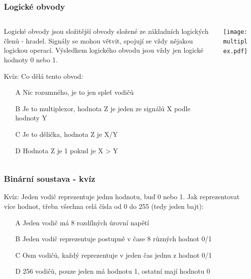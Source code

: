 \documentclass{beamer}
\begin{document}
\begin{frame}
\frametitle{Logické obvody}

\begin{columns}
\begin{column}{0.55\textwidth}
Logické obvody jsou složitější obvody složené ze základních logických členů - hradel. Signály se mohou větvit, spojují se vždy nějakou logickou operací.
Výsledkem logického obvodu jsou vždy jen logické hodnoty 0 nebo 1.

\bigskip

Kvíz: Co dělá tento obvod:
\begin{itemize}
\item[A] Nic rozumného, je to jen spleť vodičů
\item[B] Je to multiplexor, hodnota Z je jeden ze signálů X podle hodnoty Y
\item[C] Je to dělička, hodnota Z je X/Y
\item[D] Hodnota Z je 1 pokud je X > Y 
\end{itemize}
\end{column}
\begin{column}{0.45\textwidth}  
\begin{center}
   \texttt{[image: multiplex.pdf]}
\end{center}
\end{column}
\end{columns}


\end{frame}


\begin{frame}
\frametitle{Binární soustava - kvíz}

Kvíz: Jeden vodič reprezentuje jednu hodnotu, buď 0 nebo 1. Jak reprezentovat více hodnot, třeba všechna celá čísla od 0 do 255 (tedy jeden bajt):
\begin{itemize}
\item[A] Jeden vodič má 8 rozdílných úrovní napětí
\item[B] Jeden vodič reprezentuje postupně v čase 8 různých hodnot 0/1
\item[C] Osm vodičů, každý reprezentuje v jeden čas jednu z hodnot 0/1
\item[D] 256 vodičů, pouze jeden má hodnotu 1, ostatní mají hodnotu 0
\end{itemize}


\end{frame}
\end{document}
